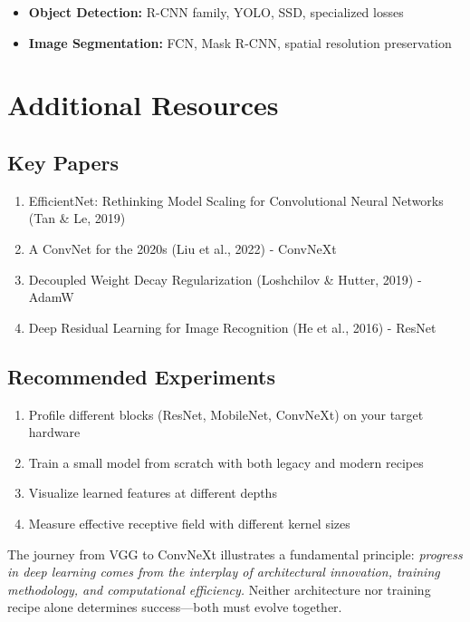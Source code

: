 \documentclass{article}
\begin{document}
\begin{itemize}
    \item \textbf{Object Detection:} R-CNN family, YOLO, SSD, specialized losses
    
    \item \textbf{Image Segmentation:} FCN, Mask R-CNN, spatial resolution preservation
\end{itemize}

\section{Additional Resources}

\subsection{Key Papers}

\begin{enumerate}
    \item EfficientNet: Rethinking Model Scaling for Convolutional Neural Networks (Tan \& Le, 2019)
    \item A ConvNet for the 2020s (Liu et al., 2022) - ConvNeXt
    \item Decoupled Weight Decay Regularization (Loshchilov \& Hutter, 2019) - AdamW
    \item Deep Residual Learning for Image Recognition (He et al., 2016) - ResNet
\end{enumerate}

\subsection{Recommended Experiments}

\begin{enumerate}
    \item Profile different blocks (ResNet, MobileNet, ConvNeXt) on your target hardware
    \item Train a small model from scratch with both legacy and modern recipes
    \item Visualize learned features at different depths
    \item Measure effective receptive field with different kernel sizes
\end{enumerate}

\vspace{1cm}

\begin{tcolorbox}[colback=blue!5!white, colframe=blue!75!black, title=Final Thought]
The journey from VGG to ConvNeXt illustrates a fundamental principle: \textit{progress in deep learning comes from the interplay of architectural innovation, training methodology, and computational efficiency.} Neither architecture nor training recipe alone determines success---both must evolve together.
\end{tcolorbox}
\end{document}

